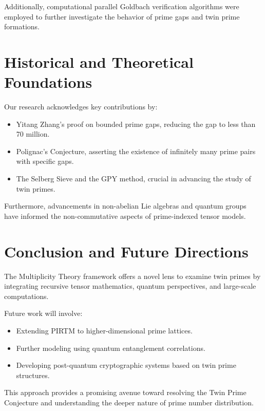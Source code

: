 \documentclass{article}
\theoremstyle{plain}
\theoremstyle{claimstyle}
\begin{document}
Additionally, computational parallel Goldbach verification algorithms were employed to further investigate the behavior of prime gaps and twin prime formations.

\section{Historical and Theoretical Foundations}

Our research acknowledges key contributions by:
\begin{itemize}
    \item Yitang Zhang’s proof on bounded prime gaps, reducing the gap to less than 70 million.
    \item Polignac’s Conjecture, asserting the existence of infinitely many prime pairs with specific gaps.
    \item The Selberg Sieve and the GPY method, crucial in advancing the study of twin primes.
\end{itemize}

Furthermore, advancements in non-abelian Lie algebras and quantum groups have informed the non-commutative aspects of prime-indexed tensor models.

\section{Conclusion and Future Directions}

The Multiplicity Theory framework offers a novel lens to examine twin primes by integrating recursive tensor mathematics, quantum perspectives, and large-scale computations. 

Future work will involve:
\begin{itemize}
    \item Extending PIRTM to higher-dimensional prime lattices.
    \item Further modeling using quantum entanglement correlations.
    \item Developing post-quantum cryptographic systems based on twin prime structures.
\end{itemize}

This approach provides a promising avenue toward resolving the Twin Prime Conjecture and understanding the deeper nature of prime number distribution.

\nocite{*}


\end{document}
